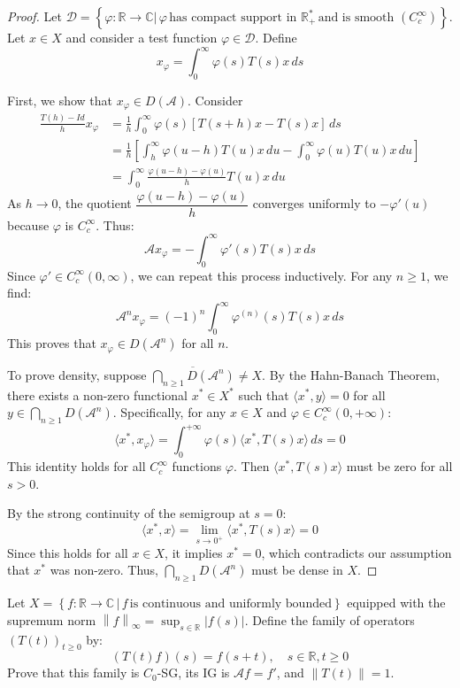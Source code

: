 \documentclass[12pt, oneside]{book}
\newcommand{\norm}[1]{\left\lVert#1\right\rVert}
\newcommand{\A}{\mathscr{A}}
\begin{document}
\begin{proof}
Let $\mathscr{D} = \left\{\varphi:\mathbb{R} \to \mathbb{C} | \, \varphi \, \text{has compact support in } \mathbb{R}^{*}_{+} \, \text{and is smooth }(C_c^{\infty}) \right\}$. Let $x \in X$ and consider a test function $\varphi \in \mathscr{D}$. Define
$$
    x_\varphi = \int_0^\infty \varphi(s) T(s)x \, ds
$$

First, we show that $x_\varphi \in D(\A)$. Consider
\begin{align*}
    \frac{T(h)-Id}{h} x_\varphi &= \frac{1}{h} \int_0^\infty \varphi(s) [T(s+h)x - T(s)x] \, ds \\
    &= \frac{1}{h} \left[ \int_h^\infty \varphi(u-h) T(u)x \, du - \int_0^\infty \varphi(u) T(u)x \, du \right] \\
    &= \int_0^\infty \frac{\varphi(u-h) - \varphi(u)}{h} T(u)x \, du
\end{align*}
As $h \to 0$, the quotient $\dfrac{\varphi(u-h) - \varphi(u)}{h}$ converges uniformly to $-\varphi'(u)$ because $\varphi$ is $C_c^{\infty}$. Thus:
$$
    \A x_\varphi = - \int_0^\infty \varphi'(s) T(s)x \, ds
$$
Since $\varphi' \in C_c^\infty(0, \infty)$, we can repeat this process inductively. For any $n \ge 1$, we find:
$$
    \A^n x_\varphi = (-1)^n \int_0^\infty \varphi^{(n)}(s) T(s)x \, ds
$$
This proves that $x_\varphi \in D(\A^n)$ for all $n$.

To prove density, suppose $\overline{\bigcap_{n \ge 1} D(\A^n)} \neq X$. By the Hahn-Banach Theorem, there exists a non-zero functional $x^* \in X^*$ such that $\langle x^*, y \rangle = 0$ for all $y \in \bigcap_{n \ge 1} D(\A^n)$. Specifically, for any $x \in X$ and $\varphi \in C_c^\infty(0, +\infty)$:
$$
	\langle x^*, x_\varphi \rangle = \int_0^{+\infty} \varphi(s) \langle x^*, T(s)x \rangle \, ds = 0
$$
This identity holds for all $C_c^{\infty}$ functions $\varphi$. Then $\langle x^*, T(s)x \rangle$ must be zero for all $s > 0$. 

By the strong continuity of the semigroup at $s=0$:
$$
    \langle x^*, x \rangle = \lim_{s \to 0^+} \langle x^*, T(s)x \rangle = 0
$$
Since this holds for all $x \in X$, it implies $x^* = 0$, which contradicts our assumption that $x^*$ was non-zero. Thus, $\bigcap_{n \ge 1} D(\A^n)$ must be dense in $X$.
\end{proof}

\begin{exercise}{}{}
Let $X = \left\{ f: \mathbb{R} \to \mathbb{C} \, | \, f \, \text{is continuous and uniformly bounded}\right\}$ equipped with the supremum norm $\norm{f}_\infty = \sup_{s \in \mathbb{R}} |f(s)|$. Define the family of operators $(T(t))_{t \ge 0}$ by:
$$
    (T(t)f)(s) = f(s+t), \quad s \in \mathbb{R}, t \ge 0
$$
Prove that this family is $C_0$-SG, its IG is $\A f = f'$, and $\norm{T(t)} = 1$.
\end{exercise}
\end{document}
